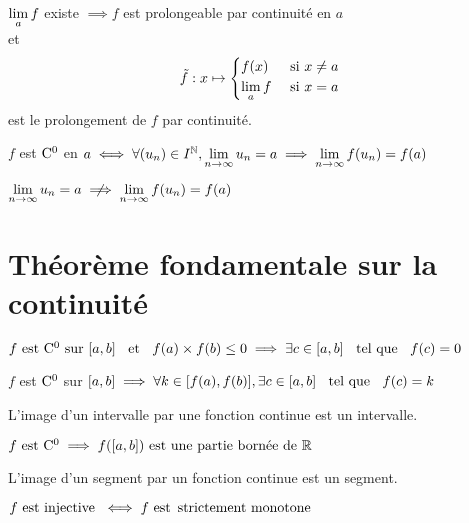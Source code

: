 \begin{dfn}
$\lim\limits_a f$ existe $\implies f$ est prolongeable par continuité en $a$ \\
et 
\[
\tilde{f} : x \mapsto
\begin{cases}
f(x)    &\text{ si } x \neq a \\
\lim\limits_a f &\text{ si } x = a
\end{cases}
\]
est le prolongement de $f$ par continuité.
\end{dfn}

\begin{prp}
$f$ est $\mathrm{C^{0}}$ en $a \iff \forall (u_n) \in I^{\mathbb{N}},
\lim\limits_{n \to \infty} u_n = a \implies \lim\limits_{n \to \infty} f(u_n) = f(a)$
\end{prp}

\begin{rem}
\begin{att}
$\lminf u_n = a \notimplies \lminf f(u_n) = f(a)$
\end{att}
\end{rem}

\section{Théorème fondamentale sur la continuité}

\begin{thm}
$f \text{ est } \mathrm{C^{0}} \text{ sur } {[a, b]} \;\;\text{ et }\;\; f(a) \times f(b) \leq 0
\implies \exists c \in {[a, b]} \;\;\text{ tel que }\;\; f(c) = 0$
\end{thm}

\begin{thm}
$f$ est $\mathrm{C^{0}}$ sur ${[a, b]} \implies 
\forall k \in {[f(a), f(b)]}, \exists c \in [a, b] \;\;\text{ tel que }\;\; f(c) = k$
\end{thm}

\begin{cor}
L'image d'un intervalle par une fonction continue est un intervalle.
\end{cor}

\begin{thm}
$f \text{ est } \mathrm{C^{0}} \implies f({[a, b]}) \text{ est une partie bornée de } \mathbb{R}$
\end{thm}

\begin{thm}
L'image d'un segment par un fonction continue est un segment.
\end{thm}

\begin{prp}
$f \text{ est injective } \iff f \text{ est } \! \text{ strictement monotone }$
\end{prp}

